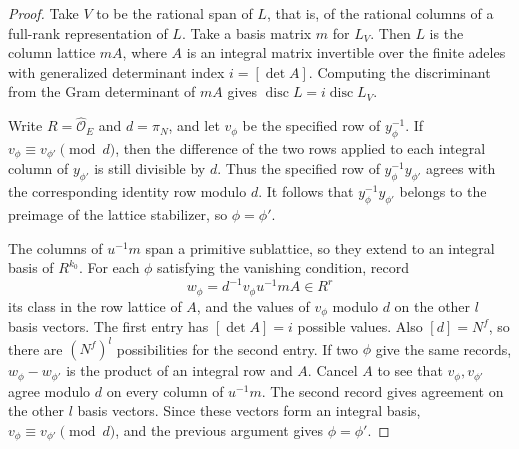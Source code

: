 \begin{proof}
Take $V$ to be the rational span of $L$, that is, of the rational columns of a full-rank representation of $L$.
Take a basis matrix $m$ for $L_V$. Then $L$ is the column lattice $mA$,
where $A$ is an integral matrix invertible over the finite adeles with generalized determinant index $i=[\det A]$.
Computing the discriminant from the Gram determinant of $mA$ gives
$\operatorname{disc}L=i\operatorname{disc}L_V$.

Write $R=\widehat{\mathcal O}_E$ and $d=\pi_N$,
and let $v_\phi$ be the specified row of $y_\phi^{-1}$. If $v_\phi\equiv v_{\phi'}\pmod{d}$,
then the difference of the two rows applied to each integral column of $y_{\phi'}$ is still divisible by $d$.
Thus the specified row of $y_\phi^{-1}y_{\phi'}$ agrees with the corresponding identity row modulo $d$.
It follows that $y_\phi^{-1}y_{\phi'}$ belongs to the preimage of the lattice stabilizer, so $\phi=\phi'$.

The columns of $u^{-1}m$ span a primitive sublattice, so they extend to an integral basis of $R^{k_0}$.
For each $\phi$ satisfying the vanishing condition, record
\[
  w_\phi=d^{-1}v_\phi u^{-1}m A\in R^r
\]
its class in the row lattice of $A$, and the values of $v_\phi$ modulo $d$ on the other $l$ basis vectors.
The first entry has $[\det A]=i$ possible values. Also $[d]=N^f$,
so there are $(N^f)^l$ possibilities for the second entry.
If two $\phi$ give the same records, $w_\phi-w_{\phi'}$ is the product of an integral row and $A$.
Cancel $A$ to see that $v_\phi,v_{\phi'}$ agree modulo $d$ on every column of $u^{-1}m$.
The second record gives agreement on the other $l$ basis vectors.
Since these vectors form an integral basis, $v_\phi\equiv v_{\phi'}\pmod d$,
and the previous argument gives $\phi=\phi'$.
\end{proof}


